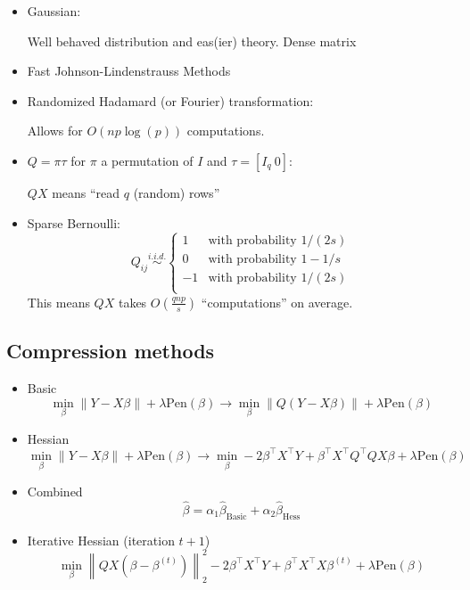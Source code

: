 \documentclass[]{article}
\begin{document}
\begin{itemize}
\item
  Gaussian:

  Well behaved distribution and eas(ier) theory. Dense matrix
\item
  Fast Johnson-Lindenstrauss Methods
\item
  Randomized Hadamard (or Fourier) transformation:

  Allows for \(O(np\log(p))\) computations.
\item
  \(Q=\pi\tau\) for \(\pi\) a permutation of \(I\) and
  \(\tau = [I_q\ 0]\):

  \(QX\) means ``read \(q\) (random) rows''
\item
  Sparse Bernoulli: \[
  Q_{ij}
  \stackrel{i.i.d.}{\sim}
  \begin{cases}
  1 & \textrm{with probability }  1/(2s) \\ 
  0 & \textrm{with probability }  1-1/s\\
  -1 & \textrm{with probability }  1/(2s) \\ 
  \end{cases}
  \] This means \(QX\) takes \(O\left(\frac{qnp}{s}\right)\)
  ``computations'' on average.
\end{itemize}

\hypertarget{compression-methods}{%
\subsection{Compression methods}\label{compression-methods}}

\begin{itemize}
\item
  Basic \[
  \min_\beta \left\lVert Y-X\beta \right\rVert + \lambda \mbox{Pen}(\beta) \longrightarrow
  \min_\beta \left\lVert Q(Y-X\beta) \right\rVert + \lambda \mbox{Pen}(\beta)
  \]
\item
  Hessian \[
  \min_\beta \left\lVert Y-X\beta \right\rVert + \lambda \mbox{Pen}(\beta) \longrightarrow
  \min_\beta -2\beta^\top X^\top Y + \beta^\top X^\top Q^\top Q X\beta + \lambda \mbox{Pen}(\beta)
  \]
\item
  Combined \[
  \widehat{\beta} = \alpha_1 \widehat{\beta}_{\textrm{Basic}} + \alpha_2\widehat{\beta}_{\textrm{Hess}}
  \]
\item
  Iterative Hessian (iteration \(t+1\)) \[
  \min_\beta \left\lVert QX(\beta-\beta^{(t)}) \right\rVert_2^2 - 2\beta^\top X^\top Y + \beta^\top X^\top X\beta^{(t)} + \lambda \mbox{Pen}(\beta)
  \]
\end{itemize}
\end{document}
